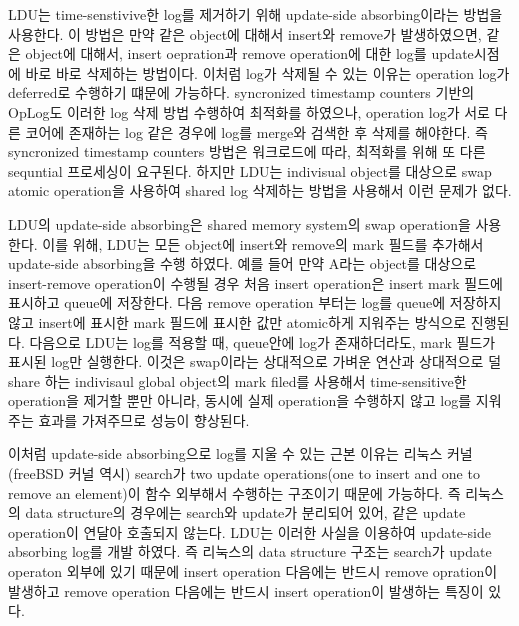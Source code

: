 \ifkor
LDU는 time-senstivive한 log를 제거하기 위해 update-side absorbing이라는 방법을 사용한다.
이 방법은 만약 같은 object에 대해서 insert와 remove가 발생하였으면, 같은 object에
대해서, insert oepration과 remove operation에 대한 log를 update시점에 바로 바로 삭제하는 방법이다. 
이처럼 log가 삭제될 수 있는 이유는 operation log가 deferred로 수행하기 떄문에 가능하다. 
syncronized timestamp counters 기반의 OpLog도 이러한 log 삭제 방법 수행하여 최적화를 하였으나,
operation log가 서로 다른 코어에 존재하는 log 같은 경우에 log를 merge와 검색한 후 삭제를 해야한다. 
즉 syncronized timestamp counters 방법은 워크로드에 따라, 최적화를 위해 또 다른 sequntial 프로세싱이
요구된다.
하지만 LDU는 indivisual object를 대상으로 swap atomic operation을 사용하여
shared log 삭제하는 방법을 사용해서 이런 문제가 없다.

LDU의 update-side absorbing은 shared memory system의 swap operation을 사용한다.
이를 위해, LDU는 모든 object에 insert와 remove의 mark 필드를 추가해서 update-side
absorbing을 수행 하였다.
예를 들어 만약 A라는 object를 대상으로 insert-remove operation이 수행될 경우 처음 insert operation은
insert mark 필드에 표시하고 queue에 저장한다.
다음 remove operation 부터는 log를 queue에 저장하지 않고 insert에 표시한 mark 필드에 표시한 값만
atomic하게 지워주는 방식으로 진행된다.
다음으로 LDU는 log를 적용할 때, queue안에 log가 존재하더라도, mark 필드가 표시된 log만 실행한다.
이것은 swap이라는 상대적으로 가벼운 연산과 상대적으로 덜 share 하는 indivisaul global object의 mark filed를
사용해서 time-sensitive한 operation을 제거할 뿐만 아니라, 동시에 실제 operation을 수행하지 않고 log를 지워주는
효과를 가져주므로 성능이 향상된다. 

\else
\fi


\ifkor
이처럼 update-side absorbing으로 log를 지울 수 있는 근본 이유는 리눅스 커널(freeBSD 커널 역시)
search가 two update operations(one to insert and one to remove an element)이 함수
외부해서 수행하는 구조이기 때문에 가능하다.
즉 리눅스의 data structure의 경우에는 search와 update가 분리되어 있어, 같은 update
operation이 연달아 호출되지 않는다.
LDU는 이러한 사실을 이용하여 update-side absorbing log를 개발 하였다. 
즉 리눅스의 data structure 구조는 search가 update operaton 외부에 있기 때문에 insert operation
다음에는 반드시 remove opration이 발생하고 remove operation 다음에는 반드시 insert operation이 발생하는
특징이 있다. %


